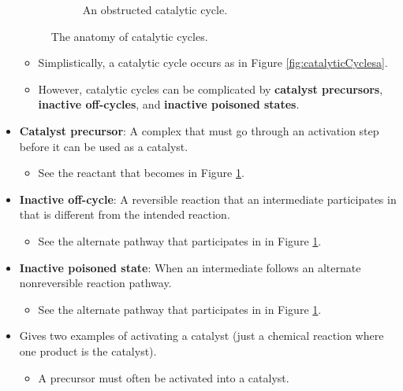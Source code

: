 \documentclass[../notes.tex]{subfiles}
\begin{document}
\begin{itemize}
\begin{figure}[h!]
\begin{subfigure}[b]{0.63\linewidth}
            \caption{An obstructed catalytic cycle.}
            \label{fig:catalyticCyclesb}
        \end{subfigure}
        \caption{The anatomy of catalytic cycles.}
        \label{fig:catalyticCycles}
    \end{figure}
    \begin{itemize}
        \item Simplistically, a catalytic cycle occurs as in Figure \ref{fig:catalyticCyclesa}.
        \item However, catalytic cycles can be complicated by \textbf{catalyst precursors}, \textbf{inactive off-cycles}, and \textbf{inactive poisoned states}.
    \end{itemize}
    \item \textbf{Catalyst precursor}: A complex that must go through an activation step before it can be used as a catalyst.
    \begin{itemize}
        \item See the reactant that becomes  in Figure \ref{fig:catalyticCyclesb}.
    \end{itemize}
    \item \textbf{Inactive off-cycle}: A reversible reaction that an intermediate participates in that is different from the intended reaction.
    \begin{itemize}
        \item See the alternate pathway that  participates in in Figure \ref{fig:catalyticCyclesb}.
    \end{itemize}
    \item \textbf{Inactive poisoned state}: When an intermediate follows an alternate nonreversible reaction pathway.
    \begin{itemize}
        \item See the alternate pathway that  participates in in Figure \ref{fig:catalyticCyclesb}.
    \end{itemize}
    \item Gives two examples of activating a catalyst (just a chemical reaction where one product is the catalyst).
    \begin{itemize}
        \item A  precursor must often be activated into a  catalyst.
    \end{itemize}

\end{itemize}
\end{document}
